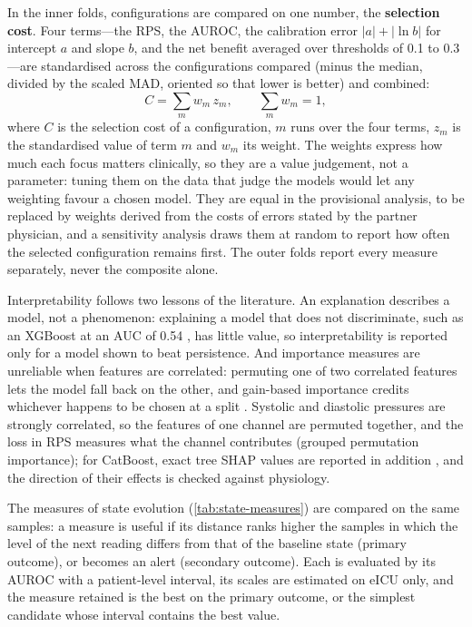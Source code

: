 In the inner folds, configurations are compared on one number, the \textbf{selection cost}. Four terms---the RPS, the AUROC, the calibration error $\lvert a\rvert + \lvert \ln b\rvert$ for intercept $a$ and slope $b$, and the net benefit averaged over thresholds of 0.1 to 0.3---are standardised across the configurations compared (minus the median, divided by the scaled MAD, oriented so that lower is better) and combined:
\begin{equation}
  C = \sum_m w_m\, z_m, \qquad \textstyle\sum_m w_m = 1 ,
\end{equation}
where $C$ is the selection cost of a configuration, $m$ runs over the four terms, $z_m$ is the standardised value of term $m$ and $w_m$ its weight. The weights express how much each focus matters clinically, so they are a value judgement, not a parameter: tuning them on the data that judge the models would let any weighting favour a chosen model. They are equal in the provisional analysis, to be replaced by weights derived from the costs of errors stated by the partner physician, and a sensitivity analysis draws them at random to report how often the selected configuration remains first. The outer folds report every measure separately, never the composite alone. 

Interpretability follows two lessons of the literature. An explanation describes a model, not a phenomenon: explaining a model that does not discriminate, such as an XGBoost at an AUC of 0.54 \parencite{mendoza2025}, has little value, so interpretability is reported only for a model shown to beat persistence. And importance measures are unreliable when features are correlated: permuting one of two correlated features lets the model fall back on the other, and gain-based importance credits whichever happens to be chosen at a split \parencite{strobl2008,gregorutti2017}. Systolic and diastolic pressures are strongly correlated, so the features of one channel are permuted together, and the loss in RPS measures what the channel contributes (grouped permutation importance); for CatBoost, exact tree SHAP values are reported in addition \parencite{lundberg2017}, and the direction of their effects is checked against physiology.

The measures of state evolution (\cref{tab:state-measures}) are compared on the same samples: a measure is useful if its distance ranks higher the samples in which the level of the next reading differs from that of the baseline state (primary outcome), or becomes an alert (secondary outcome). Each is evaluated by its AUROC with a patient-level interval, its scales are estimated on eICU only, and the measure retained is the best on the primary outcome, or the simplest candidate whose interval contains the best value.

